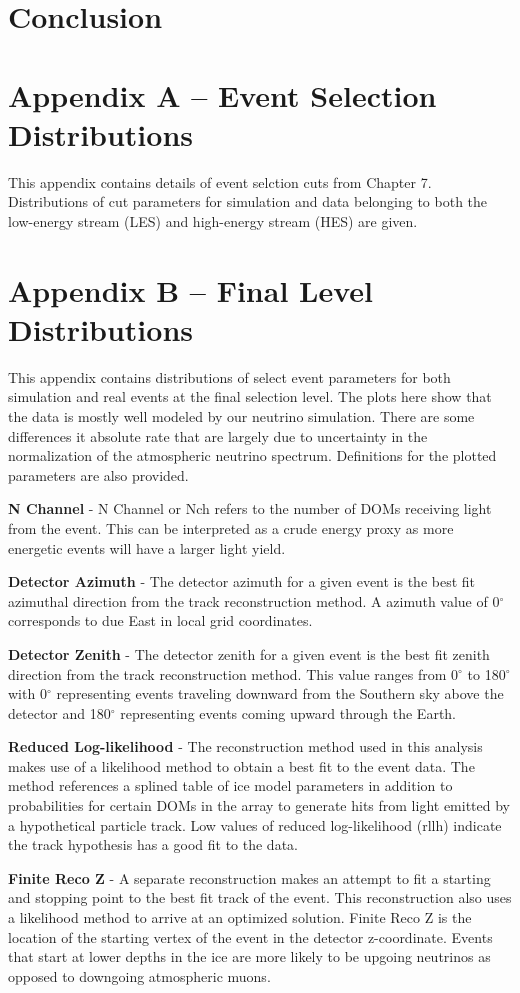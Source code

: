 \documentclass{gatech-thesis}
\begin{document}
\chapter{Conclusion}

\appendix
\chapter{Appendix A -- Event Selection Distributions}
This appendix contains details of event selction cuts from Chapter 7. Distributions of cut parameters for simulation and data belonging to both the low-energy stream (LES) and high-energy stream (HES) are given.


\chapter{Appendix B -- Final Level Distributions}
This appendix contains distributions of select event parameters for both simulation and real events at the final selection level. The plots here show that the data is mostly well modeled by our neutrino simulation. There are some differences it absolute rate that are largely due to uncertainty in the normalization of the atmospheric neutrino spectrum. Definitions for the plotted parameters are also provided.
\begin{adjustwidth}{2.5em}{2.5em}
\setlength{\parindent}{0pt}
\textbf{N Channel} - N Channel or Nch refers to the number of DOMs receiving light from the event. This can be interpreted as a crude energy proxy as more energetic events will have a larger light yield.

\textbf{Detector Azimuth} - The detector azimuth for a given event is the best fit azimuthal direction from the track reconstruction method. A azimuth value of 0$^{\circ}$ corresponds to due East in local grid coordinates.

\textbf{Detector Zenith} - The detector zenith for a given event is the best fit zenith direction from the track reconstruction method. This value ranges from 0$^{\circ}$ to 180$^{\circ}$ with 0$^{\circ}$ representing events traveling downward from the Southern sky above the detector and 180$^{\circ}$ representing events coming upward through the Earth.

\textbf{Reduced Log-likelihood} - The reconstruction method used in this analysis makes use of a likelihood method to obtain a best fit to the event data. The method references a splined table of ice model parameters in addition to probabilities for certain DOMs in the array to generate hits from light emitted by a hypothetical particle track. Low values of reduced log-likelihood (rllh) indicate the track hypothesis has a good fit to the data.

\textbf{Finite Reco Z} - A separate reconstruction makes an attempt to fit a starting and stopping point to the best fit track of the event. This reconstruction also uses a likelihood method to arrive at an optimized solution. Finite Reco Z is the location of the starting vertex of the event in the detector z-coordinate. Events that start at lower depths in the ice are more likely to be upgoing neutrinos as opposed to downgoing atmospheric muons.
\end{adjustwidth}
\end{document}
